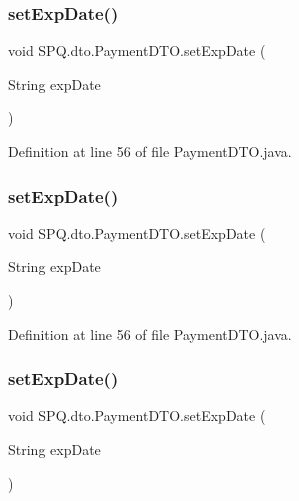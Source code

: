 \subsubsection{\texorpdfstring{set\+Exp\+Date()}{setExpDate()}\hspace{0.1cm}{\footnotesize\ttfamily [1/3]}}
{\footnotesize\ttfamily void S\+P\+Q.\+dto.\+Payment\+D\+T\+O.\+set\+Exp\+Date (\begin{DoxyParamCaption}\item[{String}]{exp\+Date }\end{DoxyParamCaption})}



Definition at line 56 of file Payment\+D\+T\+O.\+java.

\mbox{\label{class_s_p_q_1_1dto_1_1_payment_d_t_o_a6d3d88f07321648bc17e385432ee9044}} 
\subsubsection{\texorpdfstring{set\+Exp\+Date()}{setExpDate()}\hspace{0.1cm}{\footnotesize\ttfamily [2/3]}}
{\footnotesize\ttfamily void S\+P\+Q.\+dto.\+Payment\+D\+T\+O.\+set\+Exp\+Date (\begin{DoxyParamCaption}\item[{String}]{exp\+Date }\end{DoxyParamCaption})}



Definition at line 56 of file Payment\+D\+T\+O.\+java.

\mbox{\label{class_s_p_q_1_1dto_1_1_payment_d_t_o_a6d3d88f07321648bc17e385432ee9044}} 
\subsubsection{\texorpdfstring{set\+Exp\+Date()}{setExpDate()}\hspace{0.1cm}{\footnotesize\ttfamily [3/3]}}
{\footnotesize\ttfamily void S\+P\+Q.\+dto.\+Payment\+D\+T\+O.\+set\+Exp\+Date (\begin{DoxyParamCaption}\item[{String}]{exp\+Date }\end{DoxyParamCaption})}

